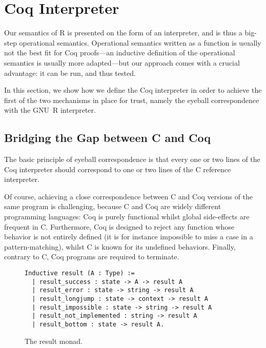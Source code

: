 \documentclass[
    sigplan,
    10pt,
    review, %
    natbib=false %
 ]{acmart}
\begin{document}
\section{Coq Interpreter}
\label{sec:coq:interp}

Our semantics of R is presented on the form of an interpreter, 
and is thus a big-step operational semantics.
Operational semantics written as a function is usually not the best fit for Coq proofs---an inductive definition of the operational semantics is usually more adapted---but our approach comes with a crucial advantage:
it can be run, and thus tested.

In this section, we show how we define the Coq interpreter in order to achieve the first of the two mechanisms in place for trust, namely the eyeball correspondence with the GNU~R interpreter.

\subsection{Bridging the Gap between C and Coq}
\label{sec:monad}

The basic principle of eyeball correspondence is that every one or two lines of the Coq interpreter should correspond to one or two lines of the C reference interpreter.

Of course, achieving a close correspondence between C and Coq versions of the same program is challenging, because C and Coq are widely different programming languages:
Coq is purely functional
whilst global side-effects are frequent in C.
Furthermore, Coq is designed to reject any function
whose behavior is not entirely defined
(it is for instance impossible to miss a case in a pattern-matching),
whilst C is known for its undefined behaviors.
Finally, contrary to C,
Coq programs are required to terminate.


\begin{figure}[t]
\begin{verbatim}
Inductive result (A : Type) :=
  | result_success : state -> A -> result A
  | result_error : state -> string -> result A
  | result_longjump : state -> context -> result A
  | result_impossible : state -> string -> result A
  | result_not_implemented : string -> result A
  | result_bottom : state -> result A.
\end{verbatim}
\caption{The result monad.}
\label{fig:result}
\end{figure}
\end{document}
